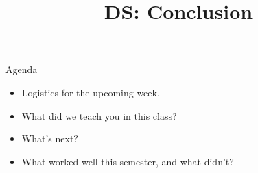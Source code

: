 \documentclass[aspectratio=169]{../latex_main/tntbeamer}  %
\title[Introduction]{DS: Conclusion}
\subtitle{}
\begin{document}
	
	\maketitle
	\begin{frame}{Agenda}
	    \begin{itemize}
	        \item Logistics for the upcoming week.
	        \item What did we teach you in this class?
	        \item What’s next?
	        \item What worked well this semester, and what didn’t?
	    \end{itemize}
	\end{frame}
\end{document}
